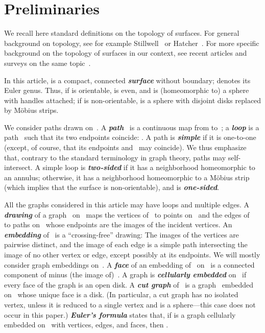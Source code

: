 \documentclass[11pt]{article}
\newcommand{\emphdef}[1]{\textcolor{blueblack}{\textbf{\emph{#1}}}}
\theoremstyle{plain}  \newtheorem{theorem}{Theorem}[section]
\theoremstyle{definition}
\begin{document}
\section{Preliminaries}\label{S:prelim}

We recall here standard definitions on the topology of surfaces.  For
general background on topology, see for example Stillwell~\cite{s-ctcgt-93}
or Hatcher~\cite{h-at-02}.  For more specific background on the topology of
surfaces in our context, see recent articles and surveys on the same
topic~\cite{ce-tnpcs-10,c-tags-12}.

In this article,  is a compact, connected \emphdef{surface} without
boundary;  denotes its Euler genus.  Thus, if  is orientable,
 is even, and  is (homeomorphic to) a sphere with  handles
attached; if  is non-orientable,  is a sphere with  disjoint
disks replaced by M\"obius strips.

We consider paths drawn on~.  A \emphdef{path}~ is a continuous map
from  to~; a \emphdef{loop} is a path~ such that its two
endpoints coincide: .  A path is \emphdef{simple} if it is
one-to-one (except, of course, that its endpoints  and~ may
coincide).  We thus emphasize that, contrary to the standard terminology in
graph theory, paths may self-intersect.  A simple loop is
\emphdef{two-sided} if it has a neighborhood homeomorphic to an annulus;
otherwise, it has a neighborhood homeomorphic to a M\"obius strip (which
implies that the surface is non-orientable), and is \emphdef{one-sided}.

All the graphs considered in this article may have loops and multiple
edges.  A \emphdef{drawing} of a graph~ on~ maps the vertices of~
to points on~ and the edges of~ to paths on~ whose endpoints are
the images of the incident vertices.  An \emphdef{embedding} of~ is a
``crossing-free'' drawing: The images of the vertices are pairwise
distinct, and the image of each edge is a simple path intersecting the
image of no other vertex or edge, except possibly at its endpoints.  We
will mostly consider graph embeddings on~.  A \emphdef{face} of an
embedding of~ on~ is a connected component of  minus (the image
of)~.  A graph is \emphdef{cellularly embedded} on~ if every face of
the graph is an open disk.  A \emphdef{cut graph} of~ is a graph~
embedded on~ whose unique face is a disk.  (In particular, a cut graph
has no isolated vertex, unless it is reduced to a single vertex and  is
a sphere---this case does not occur in this paper.)  \emphdef{Euler's
  formula} states that, if  is a graph cellularly embedded on~ with
 vertices,  edges, and  faces, then .
\end{document}
